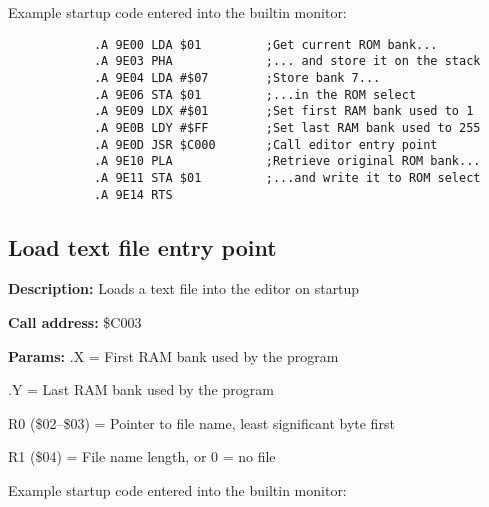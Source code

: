 \documentclass{article}
\begin{document}
        \vspace{1em}Example startup code entered into the builtin monitor:

        \begin{verbatim}
            .A 9E00 LDA $01         ;Get current ROM bank...
            .A 9E03 PHA             ;... and store it on the stack
            .A 9E04 LDA #$07        ;Store bank 7...
            .A 9E06 STA $01         ;...in the ROM select
            .A 9E09 LDX #$01        ;Set first RAM bank used to 1
            .A 9E0B LDY #$FF        ;Set last RAM bank used to 255
            .A 9E0D JSR $C000       ;Call editor entry point
            .A 9E10 PLA             ;Retrieve original ROM bank...
            .A 9E11 STA $01         ;...and write it to ROM select
            .A 9E14 RTS
        \end{verbatim}

    \subsection{Load text file entry point}

        \begin{hangparas}{3cm}{1}

            \textbf{Description:} \tabto{3cm} Loads a text file into the editor on startup

            \textbf{Call address:} \tabto{3cm}\$C003

            \textbf{Params:} \tabto{3cm}.X = First RAM bank used by the program
        
            \tabto{3cm} .Y = Last RAM bank used by the program

            \tabto{3cm} R0 (\$02--\$03) = Pointer to file name, least significant byte first

            \tabto{3cm} R1 (\$04) = File name length, or 0 = no file

        \end{hangparas}

        \vspace{1em}Example startup code entered into the builtin monitor:
\end{document}
